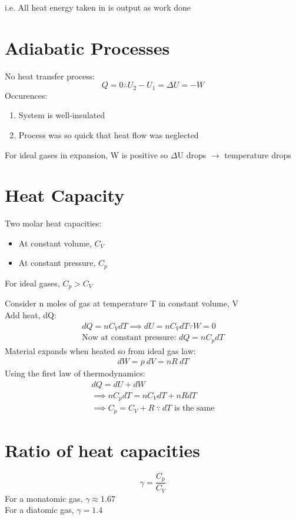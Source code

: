 \documentclass[a4paper, 11pt, fleqn, normalem]{report}
\begin{document}
i.e. All heat energy taken in is output as work done

\section{Adiabatic Processes}
No heat transfer process:
\vspace{-10pt}
\begin{equation*}
	Q = 0 \therefore U_{2} - U_{1} = {\Delta}U = -W
\end{equation*}
Occurences:
\begin{enumerate}
	\item System is well-insulated
	\item Process was so quick that heat flow was neglected
\end{enumerate}
For ideal gases in expansion, W is positive so $\Delta$U drops $\rightarrow$ temperature drops

\section{Heat Capacity}
Two molar heat capacities:
\begin{itemize}
	\item[] At constant volume, $C_{V}$
	\item[] At constant pressure, $C_{p}$
\end{itemize}
For ideal gases, $C_{p} > C_{V}$

Consider n moles of gas at temperature T in constant volume, V \\
Add heat, dQ:
\begin{gather*}
	dQ = nC_{V}dT \implies dU = nC_{V}dT \because W = 0 \\
	\text{Now at constant pressure: } dQ = nC_{p}dT
\end{gather*}
Material expands when heated so from ideal gas law:
\begin{gather*}
	dW = p\:dV = nR\:dT
\end{gather*}
Using the first law of thermodynamics:
\begin{gather*}
	dQ = dU + dW \\
	\implies nC_{p}dT = nC_{V}dT + nRdT \\
	\implies C_{p} = C_{V} + R ~\because~ dT \text{ is the same}
\end{gather*}

\section{Ratio of heat capacities}
\vspace{-22pt}
\begin{equation*}
	\gamma = \frac{C_{p}}{C_{V}}
\end{equation*}
For a monatomic gas, $\gamma \approx 1.67$ \\
For a diatomic gas, $\gamma = 1.4$
\end{document}

